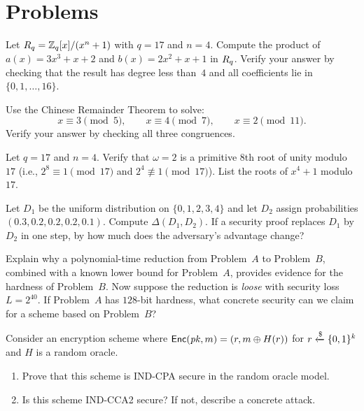 \section*{Problems}

\begin{prob}
\label{prob:ch02-ring}
Let $R_q = \mathbb{Z}_q[x]/(x^n + 1)$ with $q = 17$ and $n = 4$.  Compute the product of $a(x) = 3x^3 + x + 2$ and $b(x) = 2x^2 + x + 1$ in $R_q$.  Verify your answer by checking that the result has degree less than~$4$ and all coefficients lie in $\{0, 1, \ldots, 16\}$.
\end{prob}

\begin{prob}
\label{prob:ch02-crt}
Use the Chinese Remainder Theorem to solve:
\[
x \equiv 3 \pmod{5}, \qquad x \equiv 4 \pmod{7}, \qquad x \equiv 2 \pmod{11}.
\]
Verify your answer by checking all three congruences.
\end{prob}

\begin{prob}
\label{prob:ch02-ntt}
Let $q = 17$ and $n = 4$.  Verify that $\omega = 2$ is a primitive $8$th root of unity modulo~$17$ (i.e., $2^8 \equiv 1 \pmod{17}$ and $2^4 \not\equiv 1 \pmod{17}$).  List the roots of $x^4 + 1$ modulo~$17$.
\end{prob}

\begin{prob}
\label{prob:ch02-stat-dist}
Let $D_1$ be the uniform distribution on $\{0, 1, 2, 3, 4\}$ and let $D_2$ assign probabilities $(0.3, 0.2, 0.2, 0.2, 0.1)$.  Compute $\Delta(D_1, D_2)$.  If a security proof replaces $D_1$ by $D_2$ in one step, by how much does the adversary's advantage change?
\end{prob}

\begin{prob}
\label{prob:ch02-reduction}
Explain why a polynomial-time reduction from Problem~$A$ to Problem~$B$, combined with a known lower bound for Problem~$A$, provides evidence for the hardness of Problem~$B$.  Now suppose the reduction is \emph{loose} with security loss $L = 2^{40}$.  If Problem~$A$ has $128$-bit hardness, what concrete security can we claim for a scheme based on Problem~$B$?
\end{prob}

\begin{prob}
\label{prob:ch02-ind-cpa}
Consider an encryption scheme where $\mathsf{Enc}(\mathit{pk}, m) = (r, m \oplus H(r))$ for $r \getsr \{0,1\}^k$ and $H$ is a random oracle.
\begin{enumerate}
\item[(a)] Prove that this scheme is IND-CPA secure in the random oracle model.
\item[(b)] Is this scheme IND-CCA2 secure?  If not, describe a concrete attack.
\end{enumerate}
\end{prob}

